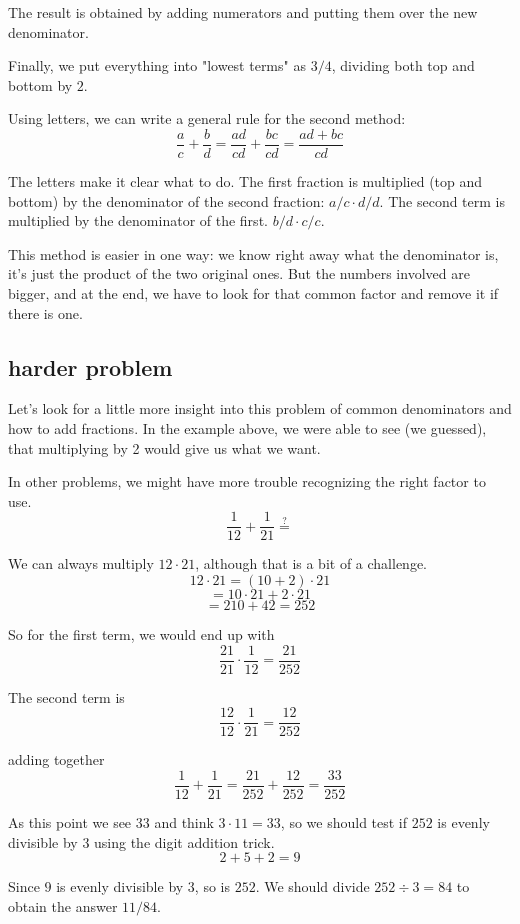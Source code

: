 \documentclass[11pt, oneside]{article}
\begin{document}
The result is obtained by adding numerators and putting them over the new denominator.  

Finally, we  put everything into "lowest terms" as $3/4$, dividing both top and bottom by $2$.

Using letters, we can write a general rule for the second method:
\[ \frac{a}{c} + \frac{b}{d} = \frac{ad}{cd} + \frac{bc}{cd}  = \frac{ad + bc}{cd} \]

The letters make it clear what to do.  The first fraction is multiplied (top and bottom) by the denominator of the second fraction:  $a/c \cdot d/d$.  The second term is multiplied by the denominator of the first.  $b/d \cdot c/c$.

This method is easier in one way:  we know right away what the denominator is, it's just the product of the two original ones.  But the numbers involved are bigger, and at the end, we have to look for that common factor and remove it if there is one.

\subsection*{harder problem}

Let's look for a little more insight into this problem of common denominators and how to add fractions.  In the example above, we were able to see (we guessed), that multiplying by 2 would give us what we want.

In other problems, we might have more trouble recognizing the right factor to use.
\[ \frac{1}{12} + \frac{1}{21} \stackrel{?}{=}  \]

We can always multiply $12 \cdot 21$, although that is a bit of a challenge.
\[ 12 \cdot 21 = (10 + 2 ) \cdot 21 \]
\[ = 10 \cdot 21 + 2 \cdot 21 \]
\[ = 210 + 42 = 252 \]

So for the first term, we would end up with 
\[ \frac{21}{21} \cdot  \frac{1}{12} = \frac{21}{252} \]

The second term is
\[ \frac{12}{12} \cdot  \frac{1}{21}  = \frac{12}{252} \]

adding together
\[ \frac{1}{12} + \frac{1}{21} = \frac{21}{252} + \frac{12}{252} = \frac{33}{252}     \]

As this point we see $33$ and think $3 \cdot 11 = 33$, so we should test if $252$ is evenly divisible by $3$ using the digit addition trick.
\[ 2 + 5 + 2 = 9 \]

Since $9$ is evenly divisible by $3$, so is $252$.  We should divide $252 \div 3 = 84$ to obtain the answer $11/84$.
\end{document}

